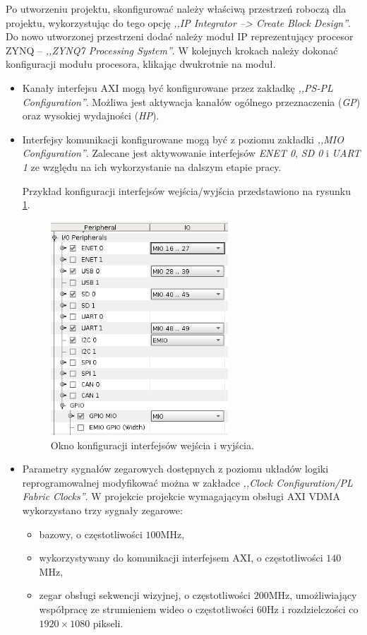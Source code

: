 Po utworzeniu projektu, skonfigurować należy właściwą przestrzeń roboczą dla projektu, wykorzystując do tego opcję \emph{,,IP Integrator --> Create Block Design''}.
Do nowo utworzonej przestrzeni dodać należy moduł IP reprezentujący procesor ZYNQ -- \emph{,,ZYNQ7 Processing System''}.
W kolejnych krokach należy dokonać konfiguracji modułu procesora, klikając dwukrotnie na moduł.

\begin{itemize}
	\item Kanały interfejsu AXI mogą być konfigurowane przez zakładkę \emph{,,PS-PL Configuration''}. Możliwa jest aktywacja kanałów ogólnego przeznaczenia (\emph{GP}) oraz wysokiej wydajności (\emph{HP}).
	
	\item Interfejsy komunikacji konfigurowane mogą być z poziomu zakładki \emph{,,MIO Configuration''}. Zalecane jest aktywowanie interfejsów \emph{ENET 0}, \emph{SD 0} i \emph{UART 1} ze względu na ich wykorzystanie na dalszym etapie pracy.
	
	Przykład konfiguracji interfejsów wejścia/wyjścia przedstawiono na rysunku \ref{fig:vivado-mio-configuration}.
	\begin{figure}[ht]
		\centering
		\includegraphics[height=8cm]{img/vivado/mio-configuration.png}
		\caption{Okno konfiguracji interfejsów wejścia i wyjścia.}
		\label{fig:vivado-mio-configuration}
	\end{figure}
	
	\item Parametry sygnałów zegarowych dostępnych z poziomu układów logiki reprogramowalnej modyfikować można w zakładce \emph{,,Clock Configuration/PL Fabric Clocks''}. W projekcie projekcie wymagającym obsługi AXI VDMA wykorzystano trzy sygnały zegarowe:
	\begin{itemize}[label=\textbullet]
		\item bazowy, o częstotliwości $100$MHz,
		\item wykorzystywany do komunikacji interfejsem AXI, o częstotliwości $140$MHz,
		\item zegar obsługi sekwencji wizyjnej, o częstotliwości $200$MHz, umożliwiający współpracę ze strumieniem wideo o częstotliwości $60$Hz i rozdzielczości co $1920 \times 1080$ pikseli.
	\end{itemize}
	

\end{itemize}
